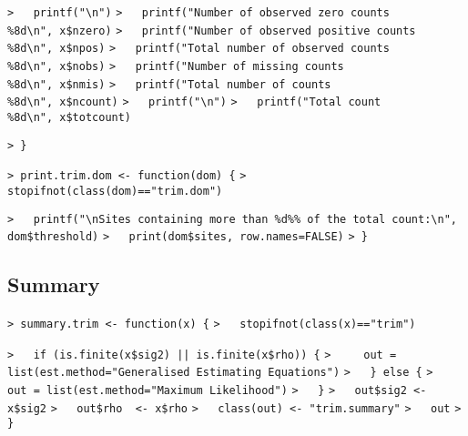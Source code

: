 \documentclass[a4paper]{article}
\begin{document}
\verb~>   printf("\n")~\newline
\verb~>   printf("Number of observed zero counts      %8d\n", x$nzero)~\newline
\verb~>   printf("Number of observed positive counts  %8d\n", x$npos)~\newline
\verb~>   printf("Total number of observed counts     %8d\n", x$nobs)~\newline
\verb~>   printf("Number of missing counts            %8d\n", x$nmis)~\newline
\verb~>   printf("Total number of counts              %8d\n", x$ncount)~\newline
\verb~>   printf("\n")~\newline
\verb~>   printf("Total count                         %8d\n", x$totcount)~\par

\verb~> }~\par

\verb~> print.trim.dom <- function(dom) {~\newline
\verb~>   stopifnot(class(dom)=="trim.dom")~\par

\verb~>   printf("\nSites containing more than %d%% of the total count:\n", dom$threshold)~\newline
\verb~>   print(dom$sites, row.names=FALSE)~\newline
\verb~> }~\par




\subsection{Summary}\par

\verb~> summary.trim <- function(x) {~\newline
\verb~>   stopifnot(class(x)=="trim")~\par

\verb~>   if (is.finite(x$sig2) || is.finite(x$rho)) {~\newline
\verb~>     out = list(est.method="Generalised Estimating Equations")~\newline
\verb~>   } else {~\newline
\verb~>     out = list(est.method="Maximum Likelihood")~\newline
\verb~>   }~\newline
\verb~>   out$sig2 <- x$sig2~\newline
\verb~>   out$rho  <- x$rho~\newline
\verb~>   class(out) <- "trim.summary"~\newline
\verb~>   out~\newline
\verb~> }~\par
\end{document}

